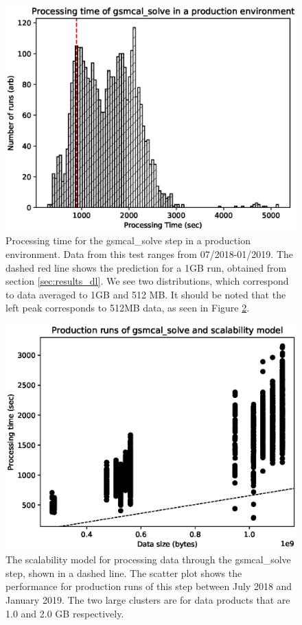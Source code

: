\documentclass[preprint,5p]{elsarticle}
\begin{document}
\begin{figure}
    \includegraphics[width=0.95\linewidth]{figures/Production_gsmcal_1GB_2.eps}
      \caption{Processing time for the {\selectfont gsmcal\_solve} step in a production environment. Data from this test ranges from 07/2018-01/2019. The dashed red line shows the prediction for a 1GB run, obtained from section \ref{sec:results_dl}. We see two distributions, which correspond to data averaged to 1GB and 512 MB.  It should be noted that the left peak corresponds to 512MB data, as seen in Figure \ref{fig:prod_gsmcal_times}.}
	\label{fig:prod_gsmcal}
\end{figure}


\begin{figure}
    \includegraphics[width=0.95\linewidth]{figures/gsmcal_solve_size_prod.eps}
      \caption{The scalability model for processing data through the {\selectfont gsmcal\_solve} step, shown in a dashed line. The scatter plot shows the performance for production runs of this step between July 2018 and January 2019. The two large clusters are for data products that are 1.0 and 2.0 GB respectively. }
	\label{fig:prod_gsmcal_times}
\end{figure}
\end{document}
